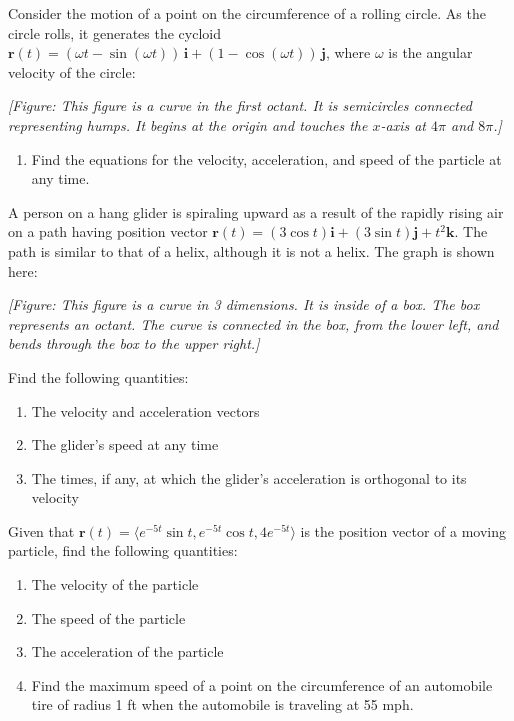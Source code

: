 \documentclass{exercises}
\begin{document}
Consider the motion of a point on the circumference of a rolling circle. As the circle rolls, it generates the cycloid $\mathbf{r}(t)=(\omega t-\sin(\omega t))\,\mathbf{i}+(1-\cos(\omega t))\,\mathbf{j}$, where $\omega$ is the angular velocity of the circle:


\textit{[Figure: This figure is a curve in the first octant. It is semicircles connected representing humps. It begins at the origin and touches the $x$-axis at $4\pi$ and $8\pi$.]}

\begin{enumerate}[resume]
\item Find the equations for the velocity, acceleration, and speed of the particle at any time.
\end{enumerate}

A person on a hang glider is spiraling upward as a result of the rapidly rising air on a path having position vector $\mathbf{r}(t)=(3\cos t)\mathbf{i}+(3\sin t)\mathbf{j}+t^{2}\mathbf{k}$. The path is similar to that of a helix, although it is not a helix. The graph is shown here:


\textit{[Figure: This figure is a curve in 3 dimensions. It is inside of a box. The box represents an octant. The curve is connected in the box, from the lower left, and bends through the box to the upper right.]}


Find the following quantities:

\begin{enumerate}[resume]
\item The velocity and acceleration vectors
\item The glider's speed at any time
\item The times, if any, at which the glider's acceleration is orthogonal to its velocity
\end{enumerate}

Given that $\mathbf{r}(t)=\langle e^{-5t}\sin t,e^{-5t}\cos t,4e^{-5t}\rangle$ is the position vector of a moving particle, find the following quantities:

\begin{enumerate}[resume]
\item The velocity of the particle
\item The speed of the particle
\item The acceleration of the particle
\item Find the maximum speed of a point on the circumference of an automobile tire of radius 1 ft when the automobile is traveling at 55 mph.
\end{enumerate}
\end{document}
